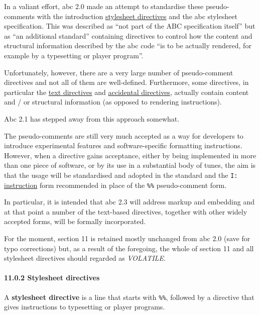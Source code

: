 \documentclass[oneside]{book}
\let\oldparagraph\paragraph
\renewcommand{\paragraph}[1]{\oldparagraph{#1}\mbox{}}
\begin{document}
In a valiant effort, abc 2.0 made an attempt to standardise these
pseudo-comments with the introduction
\protect\hyperlink{stylesheet_directive_definition}{stylesheet
directives} and the abc stylesheet specification. This was described as
``not part of the ABC specification itself'' but as ``an additional
standard'' containing directives to control how the content and
structural information described by the abc code ``is to be actually
rendered, for example by a typesetting or player program''.

Unfortunately, however, there are a very large number of pseudo-comment
directives and not all of them are well-defined. Furthermore, some
directives, in particular the \protect\hyperlink{text_directives}{text
directives} and \protect\hyperlink{accidental_directives}{accidental
directives}, actually contain content and / or structural information
(as opposed to rendering instructions).

Abc 2.1 has stepped away from this approach somewhat.

The pseudo-comments are still very much accepted as a way for developers
to introduce experimental features and software-specific formatting
instructions. However, when a directive gains acceptance, either by
being implemented in more than one piece of software, or by its use in a
substantial body of tunes, the aim is that the usage will be
standardised and adopted in the standard and the \texttt{I:}
\protect\hyperlink{iinstruction}{instruction} form recommended in place
of the \texttt{\%\%} pseudo-comment form.

In particular, it is intended that abc 2.3 will address markup and
embedding and at that point a number of the text-based directives,
together with other widely accepted forms, will be formally
incorporated.

For the moment, section 11 is retained mostly unchanged from abc 2.0
(save for typo corrections) but, as a result of the foregoing, the whole
of section 11 and all stylesheet directives should regarded as
\emph{VOLATILE}.

\hypertarget{stylesheet_directives}{\paragraph{11.0.2 Stylesheet
directives}\label{stylesheet_directives}}

\href{}{}A \textbf{stylesheet directive} is a line that starts with
\texttt{\%\%}, followed by a directive that gives instructions to
typesetting or player programs.
\end{document}

